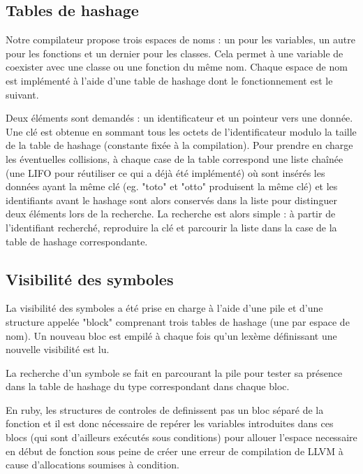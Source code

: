 \documentclass[12pt]{article}
\begin{document}
\subsection{Tables de hashage}

Notre compilateur propose trois espaces de noms : un pour les
variables, un autre pour les fonctions et un dernier pour les classes. Cela
permet à une variable de coexister avec une classe ou une fonction du même
nom. Chaque espace de nom est implémenté à l'aide d'une table de hashage dont
le fonctionnement est le suivant.

Deux éléments sont demandés : un identificateur et un pointeur vers une donnée.
Une clé est obtenue en sommant tous les octets de l'identificateur modulo la
taille de la table de hashage (constante fixée à la compilation). Pour prendre
en charge les éventuelles collisions, à chaque case de la table correspond une
liste chaînée (une LIFO pour réutiliser ce qui a déjà été implémenté) où sont
insérés les données ayant la même clé (eg. "toto" et "otto" produisent la même
clé) et les identifiants avant le hashage sont alors conservés dans la liste
pour distinguer deux éléments lors de la recherche. La recherche est alors
simple : à partir de l'identifiant recherché, reproduire la clé et parcourir
la liste dans la case de la table de hashage correspondante.


\subsection{Visibilité des symboles}

La visibilité des symboles a été prise en charge à l'aide d'une pile et d'une
structure appelée "block" comprenant trois tables de hashage (une par espace
de nom). Un nouveau bloc est empilé à chaque fois qu'un lexème définissant une
nouvelle visibilité est lu.

La recherche d'un symbole se fait en parcourant la pile pour
tester sa présence dans la table de hashage du type correspondant dans chaque
bloc.

En ruby, les structures de controles de definissent pas un bloc séparé de la
fonction et il est donc nécessaire de repérer les variables introduites dans
ces blocs (qui sont d'ailleurs exécutés sous conditions) pour allouer l'espace
necessaire en début de fonction sous peine de créer une erreur de compilation
de LLVM à cause d'allocations soumises à condition.

\end{document}

